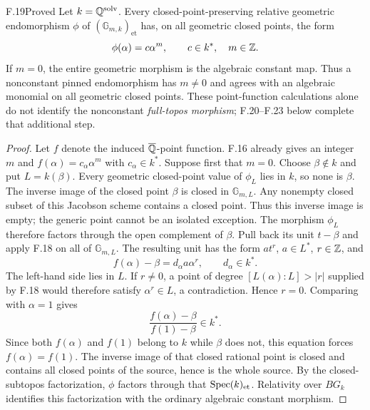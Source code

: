 \begin{claim}{F.19}{Proved}
Let $k=\mathbb Q^{\mathrm{solv}}$. Every closed-point-preserving relative
geometric endomorphism $\phi$ of $(\mathbb G_{m,k})_{\mathrm{et}}$
has, on all geometric closed points, the form
\[
 \phi(\alpha)=c\alpha^m,\qquad
 c\in k^*,\quad m\in\mathbb Z.
\]
If $m=0$, the entire geometric morphism is the algebraic constant
map. Thus a nonconstant pinned endomorphism has $m\ne0$ and
agrees with an algebraic monomial on all geometric closed points.
These point-function calculations alone do not identify the
nonconstant \emph{full-topos morphism}; F.20--F.23 below complete
that additional step.
\end{claim}
\begin{proof}
Let $f$ denote the induced $\overline{\mathbb Q}$-point function. F.16
already gives an integer $m$ and
$f(\alpha)=c_\alpha\alpha^m$ with $c_\alpha\in k^*$.
Suppose first that $m=0$. Choose $\beta\notin k$ and put
$L=k(\beta)$. Every geometric closed-point value of $\phi_L$
lies in $k$, so none is $\beta$. The inverse image of the
closed point $\beta$ is closed in $\mathbb G_{m,L}$. Any
nonempty closed subset of this Jacobson scheme contains a closed
point. Thus this inverse image is empty; the generic point cannot
be an isolated exception. The morphism $\phi_L$ therefore factors
through the open complement of $\beta$. Pull back its unit
$t-\beta$ and apply F.18 on all of $\mathbb G_{m,L}$. The
resulting unit has the form $a t^r$, $a\in L^*$, $r\in\mathbb Z$,
and
\[
 f(\alpha)-\beta=d_\alpha a\alpha^r,
 \qquad d_\alpha\in k^*.
\]
The left-hand side lies in $L$. If $r\ne0$, a point of degree
$[L(\alpha):L]>|r|$ supplied by F.18 would therefore satisfy
$\alpha^r\in L$, a contradiction. Hence $r=0$. Comparing with
$\alpha=1$ gives
\[
 \frac{f(\alpha)-\beta}{f(1)-\beta}\in k^*.
\]
Since both $f(\alpha)$ and $f(1)$ belong to $k$ while $\beta$
does not, this equation forces $f(\alpha)=f(1)$. The inverse
image of that closed rational point is closed and contains all
closed points of the source, hence is the whole source. By the
closed-subtopos factorization, $\phi$ factors through that
$\operatorname{Spec}(k)_{\mathrm{et}}$. Relativity over $BG_k$ identifies this
factorization with the ordinary algebraic constant morphism.


\end{proof}
